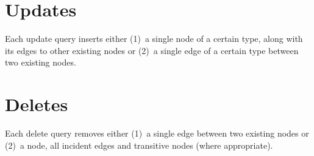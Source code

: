 


\section{Updates}
\label{sec:inserts}

Each update query inserts either (1)~a single node of a certain type, along with its edges to other existing nodes or (2)~a single edge of a certain type between two existing nodes.



\section{Deletes}
\label{sec:deletes}

Each delete query removes either (1)~a single edge between two existing nodes or (2)~a node, all incident edges and transitive nodes (where appropriate).


